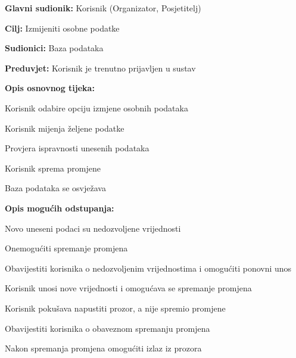 
\noindent {}
\begin{packed_item}
	
	\item \textbf{Glavni sudionik:} Korisnik (Organizator, Posjetitelj)
	\item  \textbf{Cilj:} Izmijeniti osobne podatke 
	\item  \textbf{Sudionici:} Baza podataka
	\item  \textbf{Preduvjet:} Korisnik je trenutno prijavljen u sustav
	\item  \textbf{Opis osnovnog tijeka:}
	
	\item[] \begin{packed_enum}
		
		\item Korisnik odabire opciju izmjene osobnih podataka
		\item Korisnik mijenja željene podatke 
		\item Provjera ispravnosti unesenih podataka 
		\item Korisnik sprema promjene
		\item Baza podataka se osvježava 
		
	\end{packed_enum}
	
	\item  \textbf{Opis mogućih odstupanja:}
	
	\item[] \begin{packed_item}
		
		\item[2.a] Novo uneseni podaci su nedozvoljene vrijednosti
		\item[] \begin{packed_enum}
			
			\item Onemogućiti spremanje promjena
			\item Obavijestiti korisnika o nedozvoljenim vrijednostima i omogućiti ponovni unos 
			\item Korisnik unosi nove vrijednosti i omogućava se spremanje promjena
			
		\end{packed_enum}
		
		\item[4.a] Korisnik pokušava napustiti prozor, a nije spremio promjene 
		\item[] \begin{packed_enum}
			
			\item Obavijestiti korisnika o obaveznom spremanju promjena
			\item Nakon spremanja promjena omogućiti izlaz iz prozora
			
		\end{packed_enum}
		
	\end{packed_item}
	
\end{packed_item}

